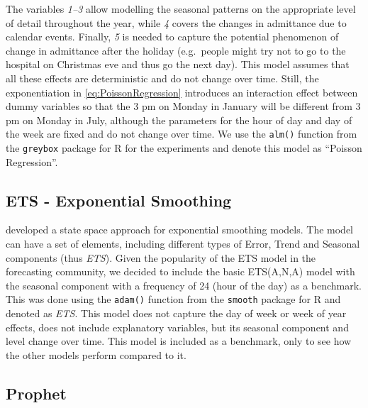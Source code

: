 \documentclass[]{elsarticle} %
\begin{document}
The variables \emph{1--3} allow modelling the seasonal patterns on the
appropriate level of detail throughout the year, while \emph{4} covers the
changes in admittance due to calendar events. Finally, \emph{5} is needed to
capture the potential phenomenon of change in admittance after the
holiday (e.g.~people might try not to go to the hospital on Christmas
eve and thus go the next day). This model assumes that all these effects
are deterministic and do not change over time. Still, the exponentiation
in \eqref{eq:PoissonRegression} introduces an interaction effect between
dummy variables so that the 3 pm on Monday in January will be different
from 3 pm on Monday in July, although the parameters for the hour of day
and day of the week are fixed and do not change over time. We use the
\texttt{alm()} function from the \texttt{greybox} package \citep{Svetunkov2021Greybox} for
R \citep{RTeam2021} for the experiments and denote this model as ``Poisson
Regression''.

\hypertarget{ets---exponential-smoothing}{%
\subsection{ETS - Exponential Smoothing}\label{ets---exponential-smoothing}}

\citet{Hyndman2008b} developed a state space approach for exponential smoothing
models. The model can have a set of elements, including different types
of Error, Trend and Seasonal components (thus \emph{ETS}). Given the
popularity of the ETS model in the forecasting community, we decided to
include the basic ETS(A,N,A) model with the seasonal component with a
frequency of 24 (hour of the day) as a benchmark. This was done using
the \texttt{adam()} function from the \texttt{smooth} package \citep{Svetunkov2021Smooth}
for R and denoted as \emph{ETS}. This model does not capture the day of week
or week of year effects, does not include explanatory variables, but its
seasonal component and level change over time. This model is included as
a benchmark, only to see how the other models perform compared to it.

\hypertarget{prophet}{%
\subsection{Prophet}\label{prophet}}
\end{document}
